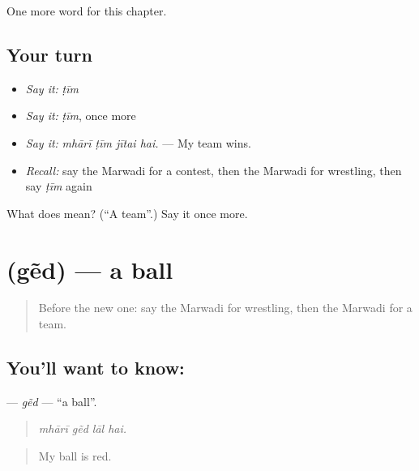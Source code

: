 \begin{grammarlens}[title={What you've built}]
One more word for this chapter.
\end{grammarlens}

\subsection*{Your turn}
\begin{itemize}
\raggedright
  \item \emph{Say it:} \emph{ṭīm}
  \item \emph{Say it:} \emph{ṭīm}, once more
  \item \emph{Say it:} \emph{mhārī ṭīm jītai hai.} — My team wins.
  \item \emph{Recall:} say the Marwadi for a contest, then the Marwadi for wrestling, then say \emph{ṭīm} again
\end{itemize}

\begin{tcolorbox}[breakable,colback=teal!4,colframe=teal!35!black,title={Before you move on}]
What does  mean? (\textquotedblleft{}A team\textquotedblright{}.) Say it once more.
\end{tcolorbox}
\section[\texorpdfstring{\mw{गेंद} (gẽd)}{गेंद (gẽd)}]{ (gẽd) — a ball}

\label{lesson:MW-C280-ged}



\begin{quote}
Before the new one: say the Marwadi for wrestling, then the Marwadi for a team.
\end{quote}

\subsection*{You'll want to know: }
\textbf{} — \emph{gẽd} — \textquotedblleft{}a ball\textquotedblright{}.

\begin{quote}
   
\end{quote}

\begin{quote}
\emph{mhārī gẽd lāl hai.}
\end{quote}

\begin{quote}
My ball is red.
\end{quote}

